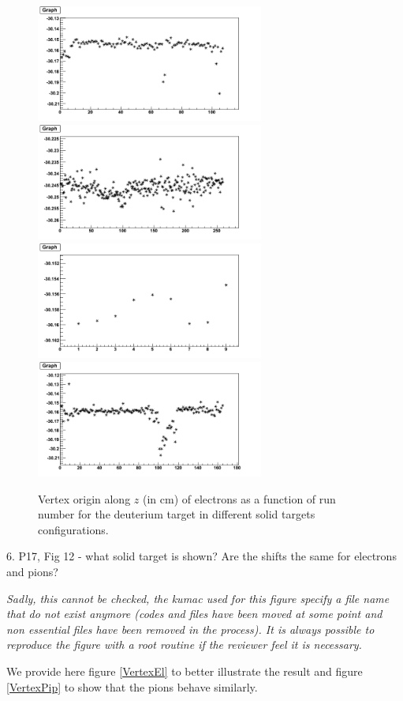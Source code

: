 \documentclass[12pt]{article}
\begin{document}
\begin{figure}[tbp]
\centering
\includegraphics[width=7.5cm] {answer-fig/VertexDeutC.png} 
\includegraphics[width=7.5cm] {answer-fig/VertexDeutFe.png} 
\includegraphics[width=7.5cm] {answer-fig/VertexDeutSn.png} 
\includegraphics[width=7.5cm] {answer-fig/VertexDeutPb.png} 
\caption {Vertex origin along $z$ (in cm) of electrons as a function of run 
number for the deuterium target in different solid targets configurations.}
\label{VertexLiquid}
\end{figure}

6.
P17, Fig 12 - what solid target is shown?  Are the shifts the same for electrons and pions?

{\it Sadly, this cannot be checked, the kumac used for this figure specify a file name that
do not exist anymore (codes and files have been moved at some point and non essential files
have been removed in the process). It is always possible to reproduce the figure with a root 
routine if the reviewer feel it is necessary. 

We provide here figure \ref{VertexEl} to better illustrate the result and figure 
\ref{VertexPip} to show that the pions behave similarly.}\\
\end{document}
